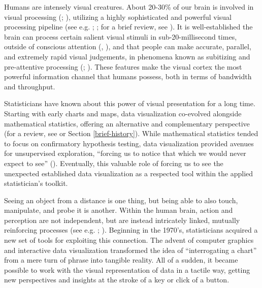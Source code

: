 \documentclass[
]{book}
\theoremstyle{definition}
\theoremstyle{definition}
\theoremstyle{definition}
\theoremstyle{definition}
\theoremstyle{remark}
\begin{document}
Humans are intensely visual creatures. About 20-30\% of our brain is involved in visual processing (; ), utilizing a highly sophisticated and powerful visual processing pipeline (see e.g. ; ; for a brief review, see ). It is well-established the brain can process certain salient visual stimuli in sub-20-millisecond times, outside of conscious attention (, ), and that people can make accurate, parallel, and extremely rapid visual judgements, in phenomena known as subitizing and pre-attentive processing (; ). These features make the visual cortex the most powerful information channel that humans possess, both in terms of bandwidth and throughput.

Statisticians have known about this power of visual presentation for a long time. Starting with early charts and maps, data visualization co-evolved alongside mathematical statistics, offering an alternative and complementary perspective (for a review, see  or Section \ref{brief-history}). While mathematical statistics tended to focus on confirmatory hypothesis testing, data visualization provided avenues for unsupervised exploration, ``forcing us to notice that which we would never expect to see'' (). Eventually, this valuable role of forcing us to see the unexpected established data visualization as a respected tool within the applied statistician's toolkit.

Seeing an object from a distance is one thing, but being able to also touch, manipulate, and probe it is another. Within the human brain, action and perception are not independent, but are instead intricately linked, mutually reinforcing processes (see e.g. ; ). Beginning in the 1970's, statisticians acquired a new set of tools for exploiting this connection. The advent of computer graphics and interactive data visualization transformed the idea of ``interrogating a chart'' from a mere turn of phrase into tangible reality. All of a sudden, it became possible to work with the visual representation of data in a tactile way, getting new perspectives and insights at the stroke of a key or click of a button.
\end{document}
